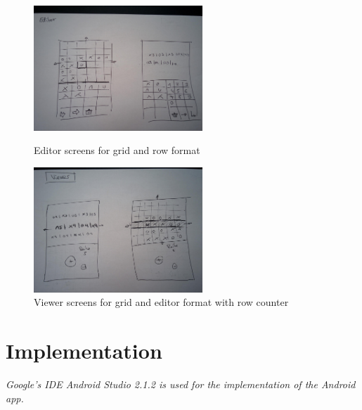 \documentclass[a4paper,11pt]{kth-mag}
\begin{document}
\begin{figure}
\centering
\begin{minipage}{.5\textwidth}
  \centering
  \includegraphics[width=2.5in]{images/image00.jpg}
  \caption{Editor screens for grid and row format}
  \label{fig_wireframe3}
\end{minipage}

\begin{minipage}{.5\textwidth}
  \centering
  \includegraphics[width=2.5in]{images/image02.jpg}
  \caption{Viewer screens for grid and editor format with row counter}
  \label{fig_wireframe4}
\end{minipage}
\end{figure}

\chapter{Implementation}
\textit{Google’s IDE Android Studio 2.1.2 is used for the implementation of the Android app. }
\end{document}
